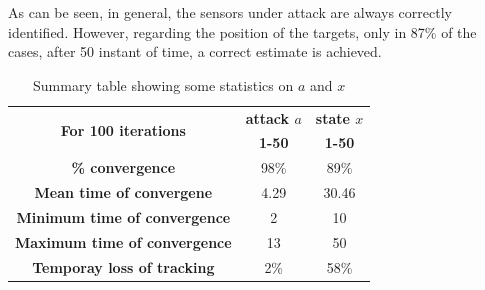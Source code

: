 \noindent
As can be seen, in general, the sensors under attack are always correctly identified. However, regarding the position of the targets, only in 87\% of the cases, after 50 instant of time, a correct estimate is achieved.
    
\begin{table}[h!]
\centering
\begin{tabular}{|c|c|c|}
\hline
\multirow{2}{*}{\textbf{For 100 iterations}} & \multicolumn{1}{|c|}{\textbf{attack $a$}} & \multicolumn{1}{|c|}{\textbf{state $x$}} \\
\cline{2-3}
 & \textbf{1-50} & \textbf{1-50}\\
\hline
\textbf{\% convergence} &98\% &89\%  \\
\hline
\textbf{Mean time of convergene} &4.29 &30.46 \\
\hline
\textbf{Minimum time of convergence} &2 &10  \\
\hline
\textbf{Maximum time of convergence} &13 &50 \\
\hline
\textbf{Temporay loss of tracking} &2\% &58\%  \\
\hline
\end{tabular}
\caption{Summary table showing some statistics on $a$ and $x$}
\label{table:4}
\end{table}
            
